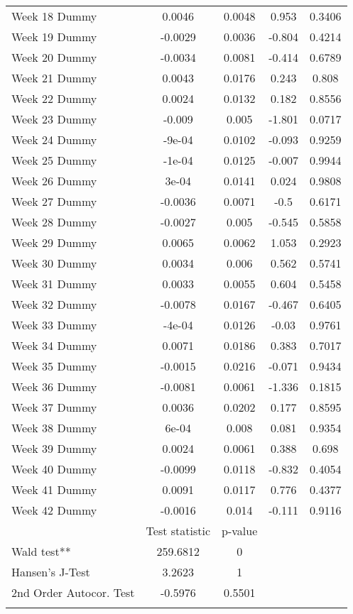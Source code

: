 \begin{longtable}{lcccc}
  Week 18 Dummy & 0.0046 & 0.0048 & 0.953 & 0.3406 \\ 
  Week 19 Dummy & -0.0029 & 0.0036 & -0.804 & 0.4214 \\ 
  Week 20 Dummy & -0.0034 & 0.0081 & -0.414 & 0.6789 \\ 
  Week 21 Dummy & 0.0043 & 0.0176 & 0.243 & 0.808 \\ 
  Week 22 Dummy & 0.0024 & 0.0132 & 0.182 & 0.8556 \\ 
  Week 23 Dummy & -0.009 & 0.005 & -1.801 & 0.0717 \\ 
  Week 24 Dummy & -9e-04 & 0.0102 & -0.093 & 0.9259 \\ 
  Week 25 Dummy & -1e-04 & 0.0125 & -0.007 & 0.9944 \\ 
  Week 26 Dummy & 3e-04 & 0.0141 & 0.024 & 0.9808 \\ 
  Week 27 Dummy & -0.0036 & 0.0071 & -0.5 & 0.6171 \\ 
  Week 28 Dummy & -0.0027 & 0.005 & -0.545 & 0.5858 \\ 
  Week 29 Dummy & 0.0065 & 0.0062 & 1.053 & 0.2923 \\ 
  Week 30 Dummy & 0.0034 & 0.006 & 0.562 & 0.5741 \\ 
  Week 31 Dummy & 0.0033 & 0.0055 & 0.604 & 0.5458 \\ 
  Week 32 Dummy & -0.0078 & 0.0167 & -0.467 & 0.6405 \\ 
  Week 33 Dummy & -4e-04 & 0.0126 & -0.03 & 0.9761 \\ 
  Week 34 Dummy & 0.0071 & 0.0186 & 0.383 & 0.7017 \\ 
  Week 35 Dummy & -0.0015 & 0.0216 & -0.071 & 0.9434 \\ 
  Week 36 Dummy & -0.0081 & 0.0061 & -1.336 & 0.1815 \\ 
  Week 37 Dummy & 0.0036 & 0.0202 & 0.177 & 0.8595 \\ 
  Week 38 Dummy & 6e-04 & 0.008 & 0.081 & 0.9354 \\ 
  Week 39 Dummy & 0.0024 & 0.0061 & 0.388 & 0.698 \\ 
  Week 40 Dummy & -0.0099 & 0.0118 & -0.832 & 0.4054 \\ 
  Week 41 Dummy & 0.0091 & 0.0117 & 0.776 & 0.4377 \\ 
  Week 42 Dummy & -0.0016 & 0.014 & -0.111 & 0.9116 \\ 
   & Test statistic & p-value &  &  \\ 
  Wald test** & 259.6812 & 0 &  &  \\ 
  Hansen's J-Test & 3.2623 & 1 &  &  \\ 
  2nd Order Autocor. Test & -0.5976 & 0.5501 &  &  \\ 
   \bottomrule
\caption{Results of two-step GMM estimation of policy, behavior and information on %
\label{tab_results:cases_spec_4_full}
\end{longtable}
\endgroup
